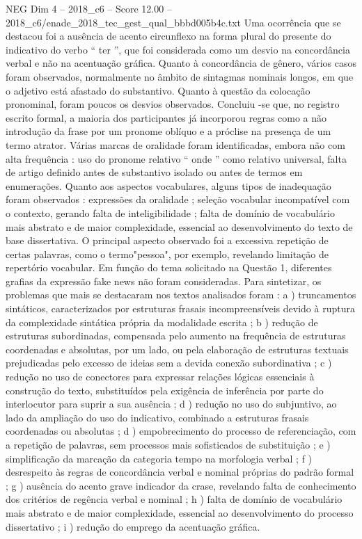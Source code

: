 \begin{textsample}{NEG Dim 4 – 2018\_c6 – Score 12.00 – 2018\_c6/enade\_2018\_tec\_gest\_qual\_bbbd005b4c.txt}
Uma ocorrência que se destacou foi a ausência de acento circunflexo na forma plural do presente do indicativo do verbo “ ter ”, que foi considerada como um desvio na concordância verbal e não na acentuação gráfica.
Quanto à concordância de gênero, vários casos foram observados, normalmente no âmbito de sintagmas nominais longos, em que o adjetivo está afastado do substantivo.
Quanto à questão da colocação pronominal, foram poucos os desvios observados.
Concluiu -se que, no registro escrito formal, a maioria dos participantes já incorporou regras como a não introdução da frase por um pronome oblíquo e a próclise na presença de um termo atrator.
Várias marcas de oralidade foram identificadas, embora não com alta frequência : uso do pronome relativo “ onde ” como relativo universal, falta de artigo definido antes de substantivo isolado ou antes de termos em enumerações.
Quanto aos aspectos vocabulares, alguns tipos de inadequação foram observados : expressões da oralidade ; seleção vocabular incompatível com o contexto, gerando falta de inteligibilidade ; falta de domínio de vocabulário mais abstrato e de maior complexidade, essencial ao desenvolvimento do texto de base dissertativa.
O principal aspecto observado foi a excessiva repetição de certas palavras, como o termo"pessoa", por exemplo, revelando limitação de repertório vocabular.
Em função do tema solicitado na Questão 1, diferentes grafias da expressão fake news não foram consideradas.
Para sintetizar, os problemas que mais se destacaram nos textos analisados foram : a ) truncamentos sintáticos, caracterizados por estruturas frasais incompreensíveis devido à ruptura da complexidade sintática própria da modalidade escrita ; b ) redução de estruturas subordinadas, compensada pelo aumento na frequência de estruturas coordenadas e absolutas, por um lado, ou pela elaboração de estruturas textuais prejudicadas pelo excesso de ideias sem a devida conexão subordinativa ; c ) redução no uso de conectores para expressar relações lógicas essenciais à construção do texto, substituídos pela exigência de inferência por parte do interlocutor para suprir a sua ausência ; d ) redução no uso do subjuntivo, ao lado da ampliação do uso do indicativo, combinado a estruturas frasais coordenadas ou absolutas ; d ) empobrecimento do processo de referenciação, com a repetição de palavras, sem processos mais sofisticados de substituição ; e ) simplificação da marcação da categoria tempo na morfologia verbal ; f ) desrespeito às regras de concordância verbal e nominal próprias do padrão formal ; g ) ausência do acento grave indicador da crase, revelando falta de conhecimento dos critérios de regência verbal e nominal ; h ) falta de domínio de vocabulário mais abstrato e de maior complexidade, essencial ao desenvolvimento do processo dissertativo ; i ) redução do emprego da acentuação gráfica.

\end{textsample}

